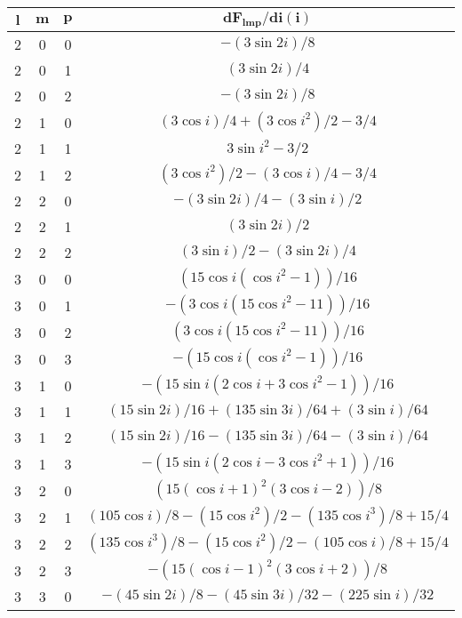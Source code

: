 \begin{table}
\centering
\begin{tabular}{|c|c|c|c|}
\hline
\hline
\rowcolor{Gray!30}$\bm l$ & $\bm m$ & $\bm p$ & $\bm {dF_{lmp}/di (i)}$ \\
\hline
2  &  0  &  0  &  $-(3 \sin 2i)/8$  \\
\hline
2  &  0  &  1  &  $(3 \sin 2i)/4$  \\
\hline
2  &  0  &  2  &  $-(3 \sin 2i)/8$  \\
\hline
2  &  1  &  0  &  $(3 \cos i)/4 + (3 \cos i^2)/2 - 3/4$  \\
\hline
2  &  1  &  1  &  $3 \sin i^2 - 3/2$  \\
\hline
2  &  1  &  2  &  $(3 \cos i^2)/2 - (3 \cos i)/4 - 3/4$  \\
\hline
2  &  2  &  0  &  $- (3 \sin 2i)/4 - (3 \sin i)/2$  \\
\hline
2  &  2  &  1  &  $(3 \sin 2i)/2$  \\
\hline
2  &  2  &  2  &  $(3 \sin i)/2 - (3 \sin 2i)/4$  \\
\hline
3  &  0  &  0  &  $(15 \cos i (\cos i^2 - 1))/16$  \\
\hline
3  &  0  &  1  &  $-(3 \cos i (15 \cos i^2 - 11))/16$  \\
\hline
3  &  0  &  2  &  $(3 \cos i (15 \cos i^2 - 11))/16$  \\
\hline
3  &  0  &  3  &  $-(15 \cos i (\cos i^2 - 1))/16$  \\
\hline
3  &  1  &  0  &  $-(15 \sin i (2 \cos i + 3 \cos i^2 - 1))/16$  \\
\hline
3  &  1  &  1  &  $(15 \sin 2i)/16 + (135 \sin 3i)/64 + (3 \sin i)/64$  \\
\hline
3  &  1  &  2  &  $(15 \sin 2i)/16 - (135 \sin 3i)/64 - (3 \sin i)/64$  \\
\hline
3  &  1  &  3  &  $-(15 \sin i (2 \cos i - 3 \cos i^2 + 1))/16$  \\
\hline
3  &  2  &  0  &  $(15 (\cos i + 1)^2 (3 \cos i - 2))/8$  \\
\hline
3  &  2  &  1  &  $(105 \cos i)/8 - (15 \cos i^2)/2 - (135 \cos i^3)/8 + 15/4$  \\
\hline
3  &  2  &  2  &  $(135 \cos i^3)/8 - (15 \cos i^2)/2 - (105 \cos i)/8 + 15/4$  \\
\hline
3  &  2  &  3  &  $-(15 (\cos i - 1)^2 (3 \cos i + 2))/8$  \\
\hline
3  &  3  &  0  &  $- (45 \sin 2i)/8 - (45 \sin 3i)/32 - (225 \sin i)/32$  \\
\hline

\end{tabular}
\end{table}
